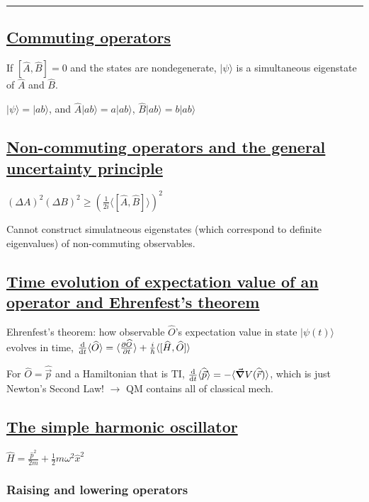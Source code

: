 \smallskip \hrule height 0.3pt

\subsection{\underline{Commuting operators}}
If $[\widehat{A}, \widehat{B}] = 0$ and the states are nondegenerate, $|\psi \rangle$ is a simultaneous eigenstate of $\widehat{A}$ and $\widehat{B}$.

$|\psi \rangle = |ab \rangle$, and $\widehat{A} | ab \rangle = a | ab \rangle$, $\widehat{B} | ab \rangle = b | ab \rangle$

\subsection{\underline{Non-commuting operators and the general uncertainty principle}}

$(\Delta A)^2 (\Delta B)^2 \geq (\frac{1}{2i} \langle [ \widehat{A}, \widehat{B} ] \rangle)^2$

Cannot construct simulatneous eigenstates (which correspond to definite eigenvalues) of non-commuting observables.

\subsection{\underline{Time evolution of expectation value of an operator and Ehrenfest's theorem}}

Ehrenfest's theorem: how observable $\widehat{O}$'s expectation value in state $|\psi(t) \rangle$ evolves in time, $\dv{}{t} \langle \widehat{O} \rangle = \langle \pdv{\widehat{O}}{t} \rangle + \frac{i}{\hbar} \langle [ \widehat{H}, \widehat{O} ] \rangle$

For $\widehat{O} = \widehat{\vec{p}}$ and a Hamiltonian that is TI, $\dv{}{t} \langle \widehat{\vec{p}} \rangle = - \langle \vec{\grad} V(\widehat{\vec{r}}) \rangle$, which is just Newton's Second Law! $\rightarrow$ QM contains all of classical mech.

\subsection{\underline{The simple harmonic oscillator}}

$\widehat{H} = \frac{\widehat{p}^2}{2m} + \frac{1}{2} m \omega^2 \widehat{x}^2$

\subsubsection{Raising and lowering operators}

